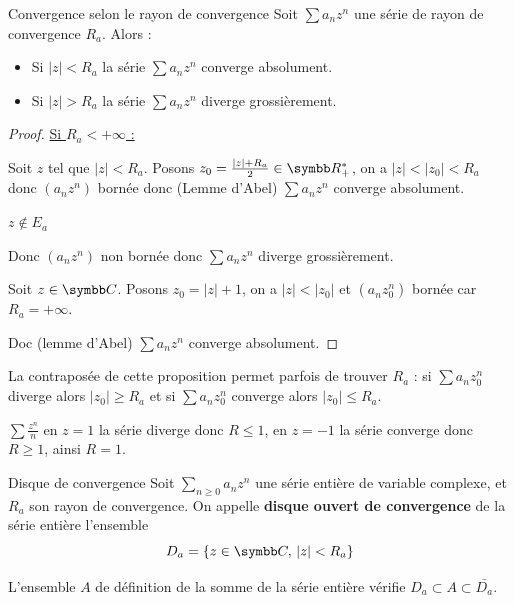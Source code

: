 \begin{proposition}{Convergence selon le rayon de convergence}{}
    Soit $\sum a_n z^n$ une série de rayon de convergence $R_a$. Alors : 
    \begin{itemize}
        \item Si $|z| < R_a$ la série $\sum a_n z^n$ converge absolument.
        \item Si $|z| > R_a$ la série $\sum a_n z^n$ diverge grossièrement.
    \end{itemize}
\end{proposition}


\begin{proof} \uline{Si $R_a < +\infty$ :}

    Soit $z$ tel que $|z| < R_a$. 
    Posons $z_0 = \frac{|z| + R_a}{2} \in \R_+^*$, on a $|z| < |z_0| < R_a$ donc 
    $(a_n z^n)$ bornée donc (Lemme d'Abel) $\sum a_n z^n$ converge absolument.

     $z \notin E_a$ 

    \svspace Donc $(a_n z^n)$ non bornée donc $\sum a_n z^n$ diverge grossièrement.


    \svspace Soit $z \in \C$. Posons $z_0 = |z| + 1$, on a $|z| < |z_0|$ et $(a_nz_0^n)$ bornée car $R_a = + \infty$. 

    Doc (lemme d'Abel) $\sum a_n z^n$ converge absolument.
\end{proof}

\begin{remarque}
    La contraposée de cette proposition permet parfois de trouver $R_a$ : 
    si $\sum a_n z_0^n$ diverge alors $|z_0| \geqslant R_a$ et si $\sum a_n z_0^n$ converge 
    alors $|z_0| \leqslant R_a$.
\end{remarque}

\begin{exemple}
    $\sum \frac{z^n} n$ en $z = 1$ la série diverge donc $R \leqslant 1$, en $z = - 1$ la série 
    converge donc $R \geqslant 1$, ainsi $R = 1$.
\end{exemple}


\begin{definition}{Disque de convergence}{}
    Soit $\sum_{n \geqslant 0} a_n z^n$ une série entière de variable complexe, et $R_a$ 
    son rayon de convergence. On appelle \textbf{disque ouvert de convergence} de la série entière 
    l'ensemble 
    $$D_a = \{z \in \C, \, |z| < R_a \}$$

    L'ensemble $A$ de définition de la somme de la série entière vérifie $D_a \subset A \subset \bar{D_a}$.
\end{definition}

